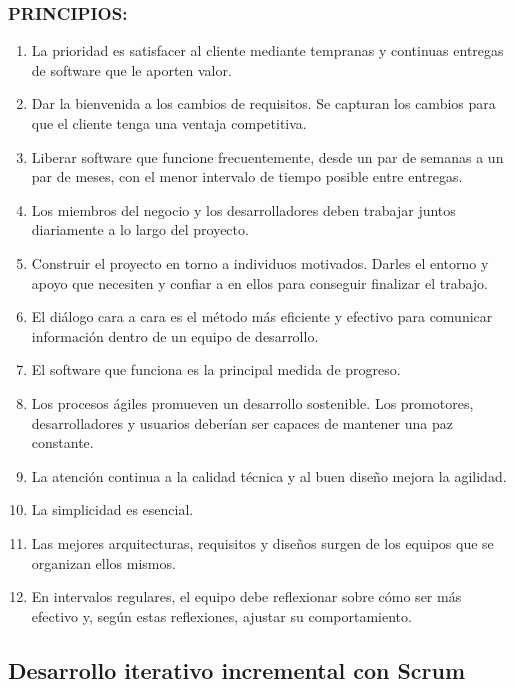 \documentclass[12pt,a4paper,spanish]{book} %
\begin{document}
\subsubsection{PRINCIPIOS:}

\begin{enumerate}

\item La prioridad es satisfacer al cliente mediante tempranas y continuas
entregas de software que le aporten valor.
\item Dar la bienvenida a los cambios de requisitos. Se capturan los cambios
para que el cliente tenga una ventaja competitiva.
\item Liberar software que funcione frecuentemente, desde un par de semanas
a un par de meses, con el menor intervalo de tiempo posible entre
entregas.
\item Los miembros del negocio y los desarrolladores deben trabajar juntos
diariamente a lo largo del proyecto.
\item Construir el proyecto en torno a individuos motivados. Darles el entorno
y apoyo que necesiten y confiar a en ellos para conseguir finalizar
el trabajo.
\item El diálogo cara a cara es el método más eficiente y efectivo para
comunicar información dentro de un equipo de desarrollo.
\item El software que funciona es la principal medida de progreso.
\item Los procesos ágiles promueven un desarrollo sostenible. Los promotores,
desarrolladores y usuarios deberían ser capaces de mantener una paz
constante.
\item La atención continua a la calidad técnica y al buen diseño mejora
la agilidad.
\item La simplicidad es esencial.
\item Las mejores arquitecturas, requisitos y diseños surgen de los equipos
que se organizan ellos mismos.
\item En intervalos regulares, el equipo debe reflexionar sobre cómo ser
más efectivo y, según estas reflexiones, ajustar su comportamiento.


\end{enumerate}



\subsection{Desarrollo iterativo incremental con Scrum}
\end{document}
